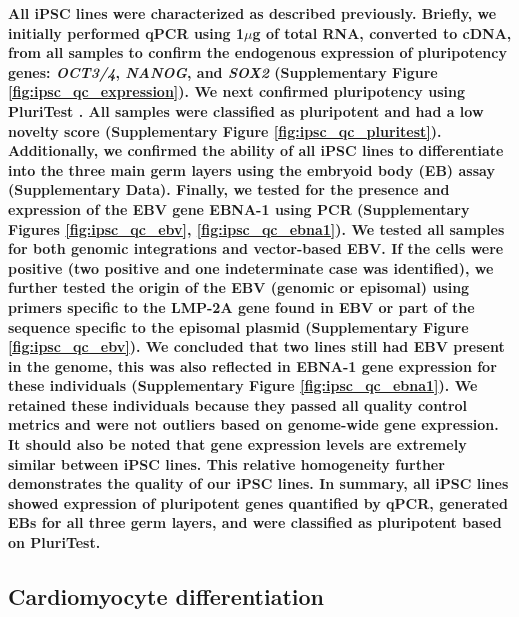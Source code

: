 \documentclass{article}
\newcommand{\tempbold}[1]{\textbf{#1}}
\begin{document}
\tempbold{All iPSC lines were characterized as described previously\cite{Gallego_Romero2015-et}. Briefly, we initially performed qPCR using 1$\mu$g of total RNA, converted to cDNA, from all samples to confirm the endogenous expression of pluripotency genes: \emph{OCT3/4}, \emph{NANOG}, and \emph{SOX2} (Supplementary Figure \ref{fig:ipsc_qc_expression}). We next confirmed pluripotency using PluriTest\cite{Muller2011} . All samples were classified as pluripotent and had a low novelty score (Supplementary Figure \ref{fig:ipsc_qc_pluritest}). Additionally, we confirmed the ability of all iPSC lines to differentiate into the three main germ layers using the embryoid body (EB) assay (Supplementary Data). Finally, we tested for the presence and expression of the EBV gene EBNA-1 using PCR (Supplementary Figures \ref{fig:ipsc_qc_ebv}, \ref{fig:ipsc_qc_ebna1}). We tested all samples for both genomic integrations and vector-based EBV. If the cells were positive (two positive and one indeterminate case was identified), we further tested the origin of the EBV (genomic or episomal) using primers specific to the LMP-2A gene found in EBV or part of the sequence specific to the episomal plasmid (Supplementary Figure \ref{fig:ipsc_qc_ebv}). We concluded that two lines still had EBV present in the genome, this was also reflected in EBNA-1
gene expression for these individuals (Supplementary Figure \ref{fig:ipsc_qc_ebna1}). We retained these individuals because they passed all quality control metrics and were not outliers based on genome-wide gene expression. It should also be noted that gene expression levels are extremely similar between iPSC lines. This relative homogeneity further demonstrates the quality of our iPSC lines. In summary, all iPSC lines showed expression of pluripotent genes quantified by qPCR, generated EBs for all three germ layers, and were classified as pluripotent based on PluriTest.}

\subsection*{Cardiomyocyte differentiation}
\end{document}
